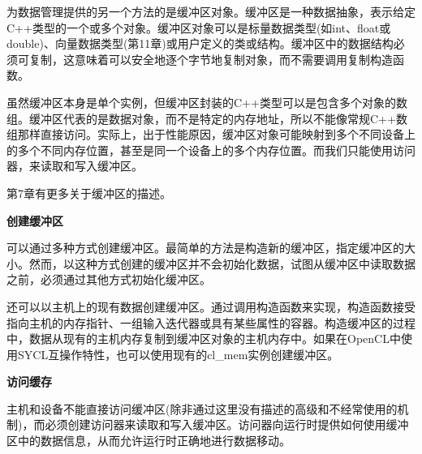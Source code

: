 为数据管理提供的另一个方法的是缓冲区对象。缓冲区是一种数据抽象，表示给定C++类型的一个或多个对象。缓冲区对象可以是标量数据类型(如int、float或double)、向量数据类型(第11章)或用户定义的类或结构。缓冲区中的数据结构必须可复制，这意味着可以安全地逐个字节地复制对象，而不需要调用复制构造函数。\par

虽然缓冲区本身是单个实例，但缓冲区封装的C++类型可以是包含多个对象的数组。缓冲区代表的是数据对象，而不是特定的内存地址，所以不能像常规C++数组那样直接访问。实际上，出于性能原因，缓冲区对象可能映射到多个不同设备上的多个不同内存位置，甚至是同一个设备上的多个内存位置。而我们只能使用访问器，来读取和写入缓冲区。\par

第7章有更多关于缓冲区的描述。\par

\hspace*{\fill} \par %
\textbf{创建缓冲区}

可以通过多种方式创建缓冲区。最简单的方法是构造新的缓冲区，指定缓冲区的大小。然而，以这种方式创建的缓冲区并不会初始化数据，试图从缓冲区中读取数据之前，必须通过其他方式初始化缓冲区。\par

还可以以主机上的现有数据创建缓冲区。通过调用构造函数来实现，构造函数接受指向主机的内存指针、一组输入迭代器或具有某些属性的容器。构造缓冲区的过程中，数据从现有的主机内存复制到缓冲区对象的主机内存中。如果在OpenCL中使用SYCL互操作特性，也可以使用现有的cl\_mem实例创建缓冲区。\par

\hspace*{\fill} \par %
\textbf{访问缓存}

主机和设备不能直接访问缓冲区(除非通过这里没有描述的高级和不经常使用的机制)，而必须创建访问器来读取和写入缓冲区。访问器向运行时提供如何使用缓冲区中的数据信息，从而允许运行时正确地进行数据移动。\par

